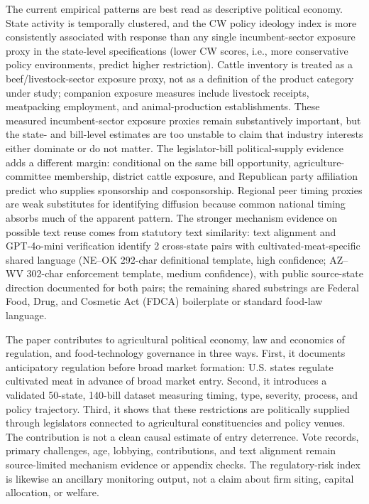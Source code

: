 \documentclass[12pt]{article}
\begin{document}
The current empirical patterns are best read as descriptive political economy.  State activity is temporally clustered, and the CW policy ideology index is more consistently associated with response than any single incumbent-sector exposure proxy in the state-level specifications (lower CW scores, i.e., more conservative policy environments, predict higher restriction).  Cattle inventory is treated as a beef/livestock-sector exposure proxy, not as a definition of the product category under study; companion exposure measures include livestock receipts, meatpacking employment, and animal-production establishments.  These measured incumbent-sector exposure proxies remain substantively important, but the state- and bill-level estimates are too unstable to claim that industry interests either dominate or do not matter.  The legislator-bill political-supply evidence adds a different margin: conditional on the same bill opportunity, agriculture-committee membership, district cattle exposure, and Republican party affiliation predict who supplies sponsorship and cosponsorship.  Regional peer timing proxies are weak substitutes for identifying diffusion because common national timing absorbs much of the apparent pattern.  The stronger mechanism evidence on possible text reuse comes from statutory text similarity: text alignment and GPT-4o-mini verification identify 2 cross-state pairs with cultivated-meat-specific shared language (NE--OK 292-char definitional template, high confidence; AZ--WV 302-char enforcement template, medium confidence), with public source-state direction documented for both pairs; the remaining shared substrings are Federal Food, Drug, and Cosmetic Act (FDCA) boilerplate or standard food-law language.

The paper contributes to agricultural political economy, law and economics of regulation, and food-technology governance in three ways.  First, it documents anticipatory regulation before broad market formation: U.S. states regulate cultivated meat in advance of broad market entry.  Second, it introduces a validated 50-state, 140-bill dataset measuring timing, type, severity, process, and policy trajectory.  Third, it shows that these restrictions are politically supplied through legislators connected to agricultural constituencies and policy venues.  The contribution is not a clean causal estimate of entry deterrence.  Vote records, primary challenges, age, lobbying, contributions, and text alignment remain source-limited mechanism evidence or appendix checks.  The regulatory-risk index is likewise an ancillary monitoring output, not a claim about firm siting, capital allocation, or welfare.
\end{document}
